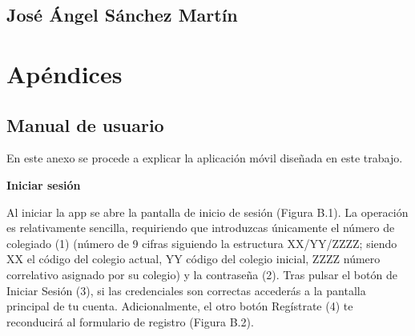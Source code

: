 \documentclass[11pt,spanish,
		listoftables,listoffigures]
		{tfgplantilla}
\begin{document}
\section{José Ángel Sánchez Martín}

\cleardoublepage

\chapter{Apéndices}

\section{Manual de usuario}

En este anexo se procede a explicar la aplicación móvil diseñada en este trabajo.

\textbf {Iniciar sesión}


Al iniciar la app se abre la pantalla de inicio de sesión (Figura B.1). La operación es relativamente sencilla, requiriendo que introduzcas únicamente el número de colegiado (1) (número de 9 cifras siguiendo la estructura XX/YY/ZZZZ; siendo XX el código del colegio actual, YY código del colegio inicial, ZZZZ número correlativo asignado por su colegio) y la contraseña (2). Tras pulsar el botón de \textquotedbl Iniciar Sesión\textquotedbl{} (3), si las credenciales son correctas accederás a la pantalla principal de tu cuenta. Adicionalmente, el otro botón \textquotedbl Regístrate\textquotedbl{} (4) te reconducirá al formulario de registro (Figura B.2).
\end{document}
